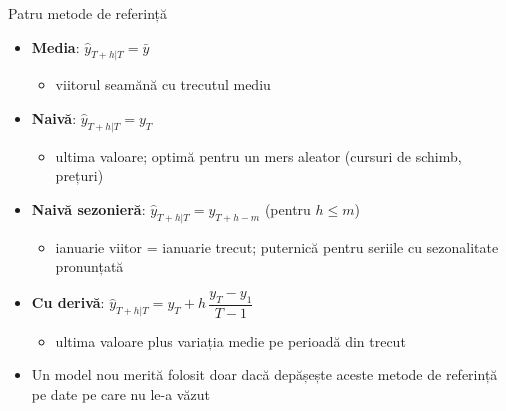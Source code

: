 \begin{frame}{Patru metode de referință}
\itemsize{\small}
\begin{itemize}
    \item \textbf{Media}: $\hat y_{T+h|T} = \bar y$
    \begin{itemize}
        \item viitorul seamănă cu trecutul mediu
    \end{itemize}
    \item \textbf{Naivă}: $\hat y_{T+h|T} = y_T$
    \begin{itemize}
        \item ultima valoare; optimă pentru un mers aleator (cursuri de schimb, prețuri)
    \end{itemize}
    \item \textbf{Naivă sezonieră}: $\hat y_{T+h|T} = y_{T+h-m}$ (pentru $h \le m$)
    \begin{itemize}
        \item ianuarie viitor = ianuarie trecut; puternică pentru seriile cu sezonalitate pronunțată
    \end{itemize}
    \item \textbf{Cu derivă}: $\hat y_{T+h|T} = y_T + h\, \dfrac{y_T - y_1}{T - 1}$
    \begin{itemize}
        \item ultima valoare plus variația medie pe perioadă din trecut
    \end{itemize}
    \item Un model nou merită folosit doar dacă depășește aceste metode de referință pe date pe care nu le-a văzut
\end{itemize}
\end{frame}


